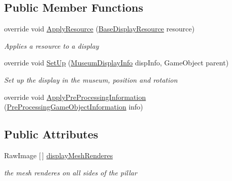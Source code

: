 \subsection*{Public Member Functions}
\begin{DoxyCompactItemize}
\item 
override void \mbox{\hyperlink{class_center_image_display_a140b8b82522c1aedb473b3cd532dcd34}{Apply\+Resource}} (\mbox{\hyperlink{class_base_display_resource}{Base\+Display\+Resource}} resource)
\begin{DoxyCompactList}\small\item\em Applies a resource to a display \end{DoxyCompactList}\item 
override void \mbox{\hyperlink{class_center_image_display_a3da996020c7d8abcd24f35660945703a}{Set\+Up}} (\mbox{\hyperlink{class_museum_display_info}{Museum\+Display\+Info}} disp\+Info, Game\+Object parent)
\begin{DoxyCompactList}\small\item\em Set up the display in the museum, position and rotation \end{DoxyCompactList}\item 
override void \mbox{\hyperlink{class_center_image_display_af746f7d72e82809aaa0b5b5bf0ad2cc0}{Apply\+Pre\+Processing\+Information}} (\mbox{\hyperlink{class_pre_processing_game_object_information}{Pre\+Processing\+Game\+Object\+Information}} info)
\end{DoxyCompactItemize}
\subsection*{Public Attributes}
\begin{DoxyCompactItemize}
\item 
Raw\+Image \mbox{[}$\,$\mbox{]} \mbox{\hyperlink{class_center_image_display_afd5ccf58dcdcddc7592026ee840cf55d}{display\+Mesh\+Renderes}}
\begin{DoxyCompactList}\small\item\em the mesh renderes on all sides of the pillar \end{DoxyCompactList}\end{DoxyCompactItemize}
